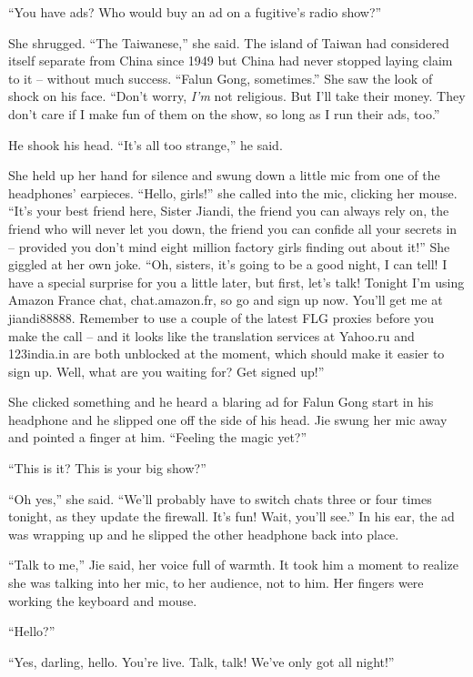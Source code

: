 ``You have ads? Who would buy an ad on a fugitive's radio show?''

She shrugged. ``The Taiwanese,'' she said. The island of Taiwan had
considered itself separate from China since 1949 but China had
never stopped laying claim to it -- without much success. ``Falun
Gong, sometimes.'' She saw the look of shock on his face. ``Don't
worry, \emph{I'm} not religious. But I'll take their money. They
don't care if I make fun of them on the show, so long as I run
their ads, too.''

He shook his head. ``It's all too strange,'' he said.

She held up her hand for silence and swung down a little mic from
one of the headphones' earpieces. ``Hello, girls!'' she called into
the mic, clicking her mouse. ``It's your best friend here, Sister
Jiandi, the friend you can always rely on, the friend who will
never let you down, the friend you can confide all your secrets in
-- provided you don't mind eight million factory girls finding out
about it!'' She giggled at her own joke. ``Oh, sisters, it's going to
be a good night, I can tell! I have a special surprise for you a
little later, but first, let's talk! Tonight I'm using Amazon
France chat, chat.amazon.fr, so go and sign up now. You'll get me
at jiandi88888. Remember to use a couple of the latest FLG proxies
before you make the call -- and it looks like the translation
services at Yahoo.ru and 123india.in are both unblocked at the
moment, which should make it easier to sign up. Well, what are you
waiting for? Get signed up!''

She clicked something and he heard a blaring ad for Falun Gong
start in his headphone and he slipped one off the side of his head.
Jie swung her mic away and pointed a finger at him. ``Feeling the
magic yet?''

``This is it? This is your big show?''

``Oh yes,'' she said. ``We'll probably have to switch chats three or
four times tonight, as they update the firewall. It's fun! Wait,
you'll see.'' In his ear, the ad was wrapping up and he slipped the
other headphone back into place.

``Talk to me,'' Jie said, her voice full of warmth. It took him a
moment to realize she was talking into her mic, to her audience,
not to him. Her fingers were working the keyboard and mouse.

``Hello?''

``Yes, darling, hello. You're live. Talk, talk! We've only got all
night!''

